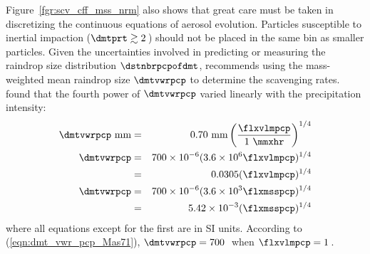 \documentclass[12pt,twoside]{book}
\begin{document}
Figure~\ref{fgr:scv_cff_mss_nrm} also shows that great care must be
taken in discretizing the continuous equations of aerosol evolution.
Particles susceptible to inertial impaction ($\dmtprt \gtrsim 2$\,\um) 
should not be placed in the same bin as smaller particles.
Given the uncertainties involved in predicting or measuring the
raindrop size distribution $\dstnbrpcpofdmt$, \cite{Sli84} recommends
using the mass-weighted mean raindrop size $\dmtvwrpcp$ to determine
the scavenging rates. 
\cite{Mas71} found that the fourth power of $\dmtvwrpcp$ varied
linearly with the precipitation intensity:
\begin{eqnarray}
\dmtvwrpcp\ \mbox{mm} & = &  
0.70\ \mbox{mm} 
\left( \frac{\flxvlmpcp}{1\ \mbox{\mmxhr} } \right)^{1/4} 
\nonumber \\
\dmtvwrpcp & = & 
700 \times 10^{-6} ( 3.6 \times 10^{6} \flxvlmpcp )^{1/4} \nonumber \\
& = & 0.0305 ( \flxvlmpcp )^{1/4} \nonumber \\
\dmtvwrpcp & = & 
700 \times 10^{-6} ( 3.6 \times 10^{3} \flxmsspcp )^{1/4} \nonumber \\
& = & 5.42 \times 10^{-3} ( \flxmsspcp )^{1/4}
\label{eqn:dmt_vwr_pcp_Mas71}
\end{eqnarray}
where all equations except for the first are in SI units.
According to (\ref{eqn:dmt_vwr_pcp_Mas71}), $\dmtvwrpcp = 700$\,\um\ 
when $\flxvlmpcp = 1$\,\mmxhr.
\end{document}
